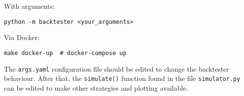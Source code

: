With arguments:
\begin{verbatim}
python -m backtester <your_arguments>
\end{verbatim}

Via Docker:
\begin{verbatim}
make docker-up  # docker-compose up
\end{verbatim}

The \texttt{args.yaml} configuration file should be edited to change the backtester behaviour. After that, the \texttt{simulate()} function found in the file \texttt{simulator.py} can be edited to make other strategies and plotting available.
